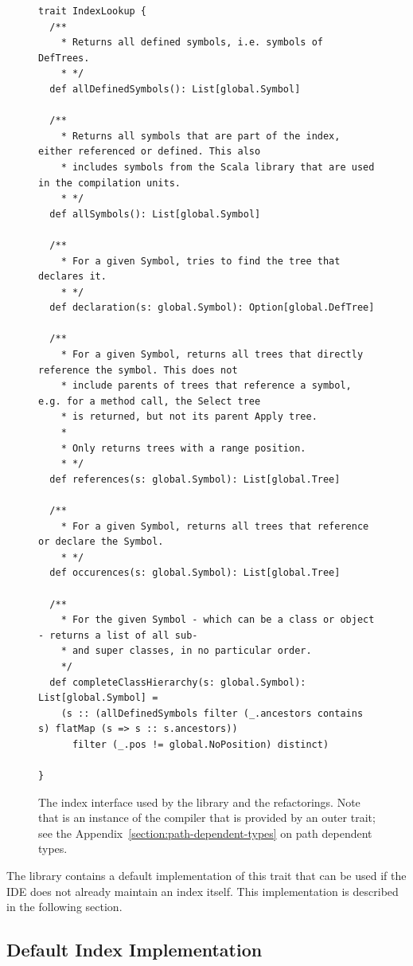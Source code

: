 \begin{figure}
\begin{lstlisting}
trait IndexLookup {
  /**
    * Returns all defined symbols, i.e. symbols of DefTrees.
    * */
  def allDefinedSymbols(): List[global.Symbol]
  
  /**
    * Returns all symbols that are part of the index, either referenced or defined. This also 
    * includes symbols from the Scala library that are used in the compilation units.
    * */
  def allSymbols(): List[global.Symbol]    
  
  /**
    * For a given Symbol, tries to find the tree that declares it.
    * */
  def declaration(s: global.Symbol): Option[global.DefTree]

  /**
    * For a given Symbol, returns all trees that directly reference the symbol. This does not 
    * include parents of trees that reference a symbol, e.g. for a method call, the Select tree 
    * is returned, but not its parent Apply tree. 
    * 
    * Only returns trees with a range position.
    * */
  def references(s: global.Symbol): List[global.Tree]
  
  /**
    * For a given Symbol, returns all trees that reference or declare the Symbol.
    * */
  def occurences(s: global.Symbol): List[global.Tree]

  /**
    * For the given Symbol - which can be a class or object - returns a list of all sub- 
    * and super classes, in no particular order.
    */
  def completeClassHierarchy(s: global.Symbol): List[global.Symbol] =
    (s :: (allDefinedSymbols filter (_.ancestors contains s) flatMap (s => s :: s.ancestors)) 
      filter (_.pos != global.NoPosition) distinct)

}
\end{lstlisting}
  \caption{The index interface used by the library and the refactorings. Note that  is an instance of the compiler that is provided by an outer trait; see the Appendix~\vref{section:path-dependent-types} on path dependent types.}
  \label{listing:index-lookup}
\end{figure}

The library contains a default implementation of this trait that can be used if the IDE does not already maintain an index itself. This implementation is described in the following section.

\subsection{Default Index Implementation}

